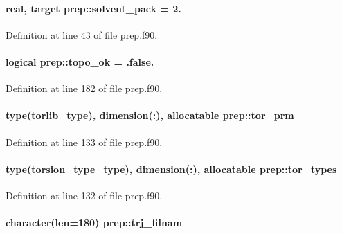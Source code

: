 \hypertarget{classprep_abbddacbd376e8aca501f6151d3114a5c}{
\paragraph[{solvent\-\_\-pack}]{\setlength{\rightskip}{0pt plus 5cm}real, target prep\-::solvent\-\_\-pack = 2.}}\label{classprep_abbddacbd376e8aca501f6151d3114a5c}


Definition at line 43 of file prep.\-f90.

\hypertarget{classprep_a2b85c6800fc53b36e3c2c07b5af26dbb}{
\paragraph[{topo\-\_\-ok}]{\setlength{\rightskip}{0pt plus 5cm}logical prep\-::topo\-\_\-ok = .false.}}\label{classprep_a2b85c6800fc53b36e3c2c07b5af26dbb}


Definition at line 182 of file prep.\-f90.

\hypertarget{classprep_a0a44d47429834f891ba1a0e8260f30e9}{
\paragraph[{tor\-\_\-prm}]{\setlength{\rightskip}{0pt plus 5cm}type(torlib\-\_\-type), dimension(\-:), allocatable prep\-::tor\-\_\-prm}}\label{classprep_a0a44d47429834f891ba1a0e8260f30e9}


Definition at line 133 of file prep.\-f90.

\hypertarget{classprep_a9fcc991cb6c52982df60dcab52ddc7b9}{
\paragraph[{tor\-\_\-types}]{\setlength{\rightskip}{0pt plus 5cm}type({\bf torsion\-\_\-type\-\_\-type}), dimension(\-:), allocatable prep\-::tor\-\_\-types}}\label{classprep_a9fcc991cb6c52982df60dcab52ddc7b9}


Definition at line 132 of file prep.\-f90.

\hypertarget{classprep_a92c84680f6cd6dc7868c862b571b1a01}{
\paragraph[{trj\-\_\-filnam}]{\setlength{\rightskip}{0pt plus 5cm}character(len=180) prep\-::trj\-\_\-filnam}}\label{classprep_a92c84680f6cd6dc7868c862b571b1a01}


